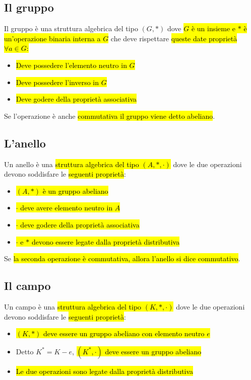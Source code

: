 \documentclass[a4paper,12pt,oneside]{article}
\begin{document}
\subsection{Il gruppo}
Il gruppo è una struttura algebrica del tipo $(G, \ast)$ dove \hl{$G$ è un insieme
e $\ast$ è un'operazione binaria interna a $G$} che deve rispettare \hl{queste date proprietà $\forall a \in G$:}
\begin{itemize}
    \item \hl{Deve possedere l'elemento neutro in $G$}
    \item \hl{Deve possedere l'inverso in $G$}
    \item \hl{Deve godere della proprietà associativa}
\end{itemize}
Se l'operazione è anche \hl{commutativa il gruppo viene detto abeliano}.

\subsection{L'anello}
Un anello è una \hl{struttura algebrica del tipo $(A, \ast, \cdot)$} dove le due
operazioni devono soddisfare le \hl{seguenti proprietà}:
\begin{itemize}
    \item \hl{$(A, \ast)$ è un gruppo abeliano}
    \item \hl{$\cdot$ deve avere elemento neutro in $A$}
    \item \hl{$\cdot$ deve godere della proprietà associativa}
    \item \hl{$\cdot$ e $\ast$ devono essere legate dalla proprietà distributiva}
\end{itemize}
Se \hl{la seconda operazione è commutativa, allora l'anello si dice commutativo}.

\subsection{Il campo}
Un campo è una \hl{struttura algebrica del tipo $(K, \ast, \cdot)$} dove le due
operazioni devono soddisfare le \hl{seguenti proprietà}:
\begin{itemize}
    \item \hl{$(K, \ast)$ deve essere un gruppo abeliano con elemento neutro $e$}
    \item Detto $K^* = K - {e}$, \hl{$(K^*, \cdot)$ deve essere un gruppo abeliano}
    \item \hl{Le due operazioni sono legate dalla proprietà distributiva}
\end{itemize}
\end{document}
